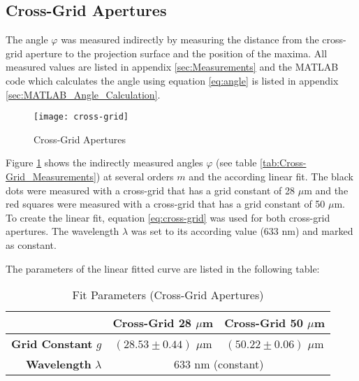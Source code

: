 \subsection{Cross-Grid Apertures}
\label{subsec:Cross-Grid}
The angle $\varphi$ was measured indirectly by measuring the distance from the cross-grid aperture to the projection surface and the position of the maxima. All measured values are listed in appendix \ref{sec:Measurements} and the MATLAB code which calculates the angle using equation \ref{eq:angle} is listed in appendix \ref{sec:MATLAB_Angle_Calculation}.
\begin{figure}[H]
	\centering
	\texttt{[image: cross-grid]}
	\caption{Cross-Grid Apertures}
	\label{fig:Cross-Grid}
\end{figure}
Figure \ref{fig:Cross-Grid} shows the indirectly measured angles $\varphi$ (see table \ref{tab:Cross-Grid_Measurements}) at several orders $m$ and the according linear fit. The black dots were measured with a cross-grid that has a grid constant of 28 $\mu$m and the red squares were measured with a cross-grid that has a grid constant of 50 $\mu$m. To create the linear fit, equation \ref{eq:cross-grid} was used for both cross-grid apertures. The wavelength $\lambda$ was set to its according value (633 nm) and marked as constant.

The parameters of the linear fitted curve are listed in the following table:
\begin{table}[H]
	\centering
	\renewcommand{\arraystretch}{1.3}
	\begin{tabular}{r|c c}
		& \textbf{Cross-Grid 28 $\mu$m} & \textbf{Cross-Grid 50 $\mu$m} \\
		\hline\hline
		\textbf{Grid Constant} $g$ & $(28.53\pm0.44)$ $\mu$m & $(50.22\pm0.06)$ $\mu$m \\		
		\textbf{Wavelength} $\lambda$ & \multicolumn{2}{c}{633 nm (constant)}
	\end{tabular}
	\caption{Fit Parameters (Cross-Grid Apertures)}
	\label{tab:Cross-Grid}
\end{table}
